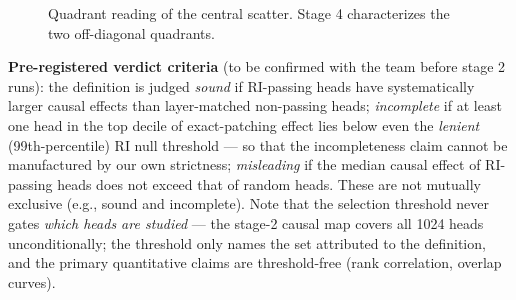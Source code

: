 \documentclass[11pt,a4paper]{article}
\begin{document}
\begin{figure}[ht]
\centering
{}
\caption{Quadrant reading of the central scatter. Stage 4 characterizes the two off-diagonal quadrants.}
\end{figure}

\textbf{Pre-registered verdict criteria} (to be confirmed with the team before stage 2 runs):
the definition is judged \emph{sound} if RI-passing heads have systematically larger causal effects than layer-matched non-passing heads;
\emph{incomplete} if at least one head in the top decile of exact-patching effect lies below even the \emph{lenient} (99th-percentile) RI null threshold --- so that the incompleteness claim cannot be manufactured by our own strictness;
\emph{misleading} if the median causal effect of RI-passing heads does not exceed that of random heads.
These are not mutually exclusive (e.g., sound and incomplete). Note that the selection threshold never gates \emph{which heads are studied} --- the stage-2 causal map covers all 1024 heads unconditionally; the threshold only names the set attributed to the definition, and the primary quantitative claims are threshold-free (rank correlation, overlap curves).
\end{document}

